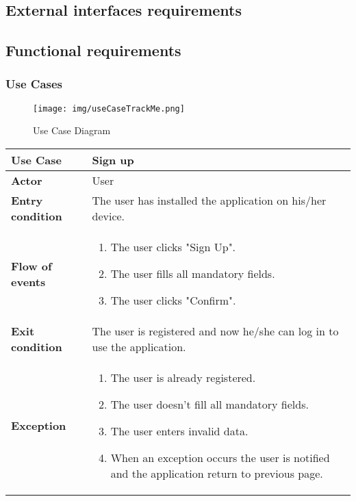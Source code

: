 \documentclass[../main.tex]{subfiles}
\begin{document}
\subsection{External interfaces requirements}
\subsection{Functional requirements}
	\subsubsection{Use Cases}
	\begin{figure}[htbp]
		\centering
		\texttt{[image: img/useCaseTrackMe.png]}
		\caption{Use Case Diagram \label{fig:Use Case Diagram}}
	\end{figure}
	\begin{center}
		\begin{tabular}{p{3cm}p{8.28cm}}
			\hline
			\textbf{Use Case} & Sign up\\
			\hline
			\textbf{Actor} & User\\
			\hline
			\textbf{Entry condition} & The user has installed the application on his/her device.\\
			\hline
			\textbf{Flow of events} & \begin{enumerate}
				\linespread{0}\item The user clicks "Sign Up".
				\linespread{0}\item The user fills all mandatory fields.
				\linespread{0}\item The user clicks "Confirm".
			\end{enumerate}\\
			\hline
			\textbf{Exit condition} & The user is registered and now he/she can log in to use the application.\\
			\hline
			\textbf{Exception} & \begin{enumerate}
				\linespread{0}\item The user is already registered.
				\linespread{0}\item The user doesn't fill all mandatory fields.
				\linespread{0}\item The user enters invalid data.
				\linespread{0}\item When an exception occurs the user is notified and the application return to previous page.
			\end{enumerate}\\
			\hline
		\end{tabular}
	\end{center}
\end{document}
